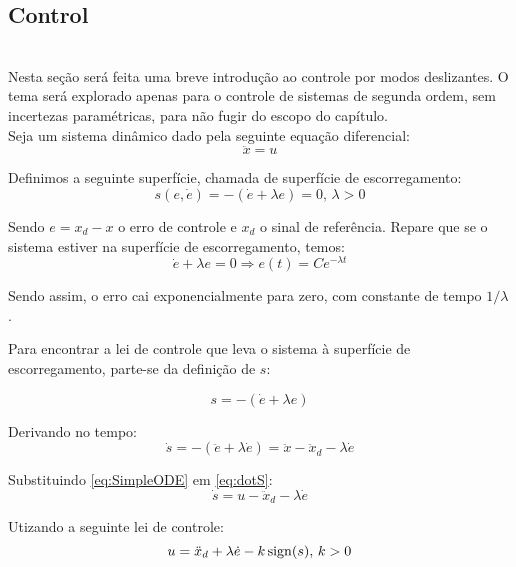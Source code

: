  \subsection{Control}\label{S03-2}
 
\\

Nesta se\c{c}\~ao ser\'a feita uma breve introdu\c{c}\~ao ao controle por modos deslizantes. O tema ser\'a explorado apenas para o controle de sistemas de segunda ordem, sem incertezas param\'etricas, para n\~ao fugir do escopo do cap\'itulo. \\

Seja um sistema din\^amico dado pela seguinte equa\c{c}\~ao diferencial:
\begin{equation} \label{eq:SimpleODE}
\ddot{x} = u
\end{equation}

Definimos a seguinte superf\'icie, chamada de superf\'icie de escorregamento:
\begin{equation} \label{eq:SlidingSurface}
s(e, \dot{e}) = - (\dot{e} + \lambda e) = 0, \, \lambda > 0
\end{equation}

Sendo $e = x_d - x$ o erro de controle e $x_d$ o sinal de refer\^encia. Repare que se o sistema estiver na superf\'icie de escorregamento, temos:
\begin{equation} \label{eq:SlidingError}
\dot{e} + \lambda e = 0 \Rightarrow e(t) = C e^{- \lambda t}
\end{equation}

Sendo assim, o erro cai exponencialmente para zero, com constante de tempo $1/\lambda$.

Para encontrar a lei de controle que leva o sistema \`a superf\'icie de escorregamento, parte-se da defini\c{c}\~ao de $s$:

$$ s = -(\dot{e} + \lambda e) $$

Derivando no tempo:
\begin{equation} \label{eq:dotS}
\dot{s} =  -(\ddot{e} + \lambda \dot{e}) = \ddot{x} - \ddot{x}_d - \lambda \dot{e} 
\end{equation}

Substituindo \eqref{eq:SimpleODE} em \eqref{eq:dotS}:
\begin{equation} \label{dotS2}
\dot{s} = u - \ddot{x}_d - \lambda \dot{e}
\end{equation}

Utizando a seguinte lei de controle:
\begin{equation} \label{SMControlLaw1D}
u = \ddot{x}_d + \lambda \dot{e} - k \operatorname*{sign} (s), \, k>0
\end{equation}

